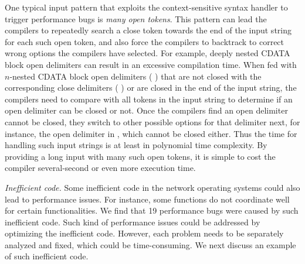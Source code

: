 One typical input pattern that exploits the context-sensitive syntax handler to trigger performance bugs is \emph{many open tokens}.
%
This pattern can lead the compilers to repeatedly search a close token towards the end of the input string for each such open token, and also force the compilers to backtrack to correct wrong options the compilers have selected.
%
%
For example, deeply nested CDATA block open delimiters can result in an excessive compilation time.
%
%
%
When fed with $n$-nested CDATA block open delimiters (\eg{,} \blstinline{'<![!CDATA[<![CDATA[<![CDATA[...'}) that are not closed with the corresponding close delimiters (\ie{,} \blstinline{']]>'}) or are closed in the end of the input string,
%
the compilers need to compare with all tokens in the input string to determine if an open delimiter can be closed or not.
%
Once the compilers find an open delimiter cannot be closed, they switch to other possible options for that delimiter next, for instance, the open delimiter  in , which cannot be closed either.
%
%
Thus the time for handling such input strings is at least in polynomial time complexity.
%
By providing a long input with many such open tokens, it is simple to cost the compiler several-second or even more execution time.
\fi


 \emph{Inefficient code.}
%
Some inefficient code in the network operating systems could also lead to performance issues.
%
For instance, some functions do not coordinate well for certain functionalities.
%
We find that 19 performance bugs were caused by such inefficient code.
%
Such kind of performance issues could be addressed by optimizing the inefficient code.
%
However, each problem needs to be separately analyzed and fixed, which could be time-consuming.
%
We next discuss an example of such inefficient code.
%

